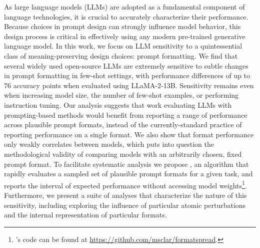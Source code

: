 As large language models (LLMs) are adopted as a fundamental component of language technologies, it is crucial to accurately characterize their performance. Because choices in prompt design can strongly influence model behavior, this design process is critical in effectively using any modern pre-trained generative language model. In this work, we focus on LLM sensitivity to a quintessential class of meaning-preserving design choices: prompt formatting. We find that several widely used open-source LLMs are extremely sensitive to subtle changes in prompt formatting in few-shot settings, with performance differences of up to 76 accuracy points when evaluated using LLaMA-2-13B. Sensitivity remains even when increasing model size, the number of few-shot examples, or performing instruction tuning. Our analysis suggests that work evaluating LLMs with prompting-based methods would benefit from reporting a range of performance across plausible prompt formats, instead of the currently-standard practice of reporting performance on a single format. We also show that format performance only weakly correlates between models, which puts into question the methodological validity of comparing models with an arbitrarily chosen, fixed prompt format. To facilitate systematic analysis we propose \toolname{}, an algorithm that rapidly evaluates a sampled set of plausible prompt formats for a given task, and reports the interval of expected performance without accessing model weights\footnote{\toolname{}'s code can be found at \url{https://github.com/msclar/formatspread}.
}. Furthermore, we present a suite of analyses that characterize the nature of this sensitivity, including exploring the influence of particular atomic perturbations and the internal representation of particular formats.
